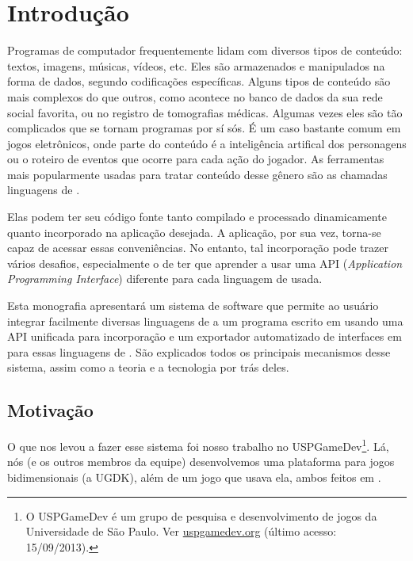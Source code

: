 
\chapter{Introdução}
\label{sec:intr}

Programas de computador frequentemente lidam com diversos tipos de conteúdo:
textos, imagens, músicas, vídeos, etc. Eles são armazenados e manipulados na
forma de dados, segundo codificações específicas. Alguns tipos de conteúdo são
mais complexos do que outros, como acontece no banco de dados da sua rede social
favorita, ou no registro de tomografias médicas. Algumas vezes eles são tão
complicados que se tornam programas por sí sós. É um caso bastante comum em
jogos eletrônicos, onde parte do conteúdo é a inteligência artifical dos
personagens ou o roteiro de eventos que ocorre para cada ação do jogador.
As ferramentas mais popularmente usadas para tratar conteúdo desse gênero são
as chamadas linguagens de \script{}.

Elas podem ter seu código fonte tanto compilado e processado
dinamicamente quanto incorporado na aplicação desejada. A aplicação, por sua
vez, torna-se capaz de acessar essas conveniências. No entanto, tal incorporação
pode trazer vários desafios, especialmente o de ter que aprender a usar uma API
(\textit{Application Programming Interface}) diferente para cada linguagem de
\script{} usada.

Esta monografia apresentará um sistema de software que permite ao usuário
integrar facilmente diversas linguagens de \script{} a um programa escrito em
\CXX{} usando uma API unificada para incorporação e um exportador
automatizado de interfaces em \CXX{} para essas linguagens de \script{}. São
explicados todos os principais mecanismos desse sistema, assim como a teoria e a
tecnologia por trás deles.

\section{Motivação}
\label{sec:intr:motivacao}
O que nos levou a fazer esse sistema foi nosso trabalho no USPGameDev\footnote{
  O USPGameDev é um grupo de pesquisa e desenvolvimento de jogos da
  Universidade de São Paulo. Ver \url{uspgamedev.org} (último acesso: 
  15/09/2013).
}.
Lá, nós (e os outros membros da equipe) desenvolvemos uma plataforma para jogos
bidimensionais (a UGDK\footnotemark), além de um jogo que usava ela, ambos feitos em \CXX{}.

